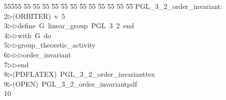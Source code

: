 %
%
\begin{tabbing}
55555 \= 55 \= 55 \= 55 \= 55 \= 55 \= 55 \= 55 \= 55 \= 55 \= 55 \= 55 \= 55 \= \>PGL\_3\_2\_order\_invariant:\\[0pt]
2\>$\triangleright$\>(ORBITER)\ v\ 5\ \\[0pt]
3\>$\triangleright$\>$\triangleright$\>define\ G\ linear\_group\ PGL\ 3\ 2\ end\ \\[0pt]
4\>$\triangleright$\>$\triangleright$\>with\ G\ do\ \\[0pt]
5\>$\triangleright$\>$\triangleright$\>group\_theoretic\_activity\ \\[0pt]
6\>$\triangleright$\>$\triangleright$\>$\triangleright$\>order\_invariant\ \\[0pt]
7\>$\triangleright$\>$\triangleright$\>end\\[0pt]
8\>$\triangleright$\>(PDFLATEX)\ PGL\_3\_2\_order\_invarianttex\\[0pt]
9\>$\triangleright$\>(OPEN)\ PGL\_3\_2\_order\_invariantpdf\\[0pt]
10\>\end{tabbing}
